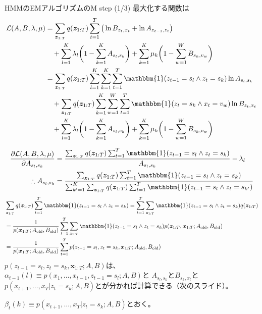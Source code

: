 \documentclass[aspectratio=169,unicode,dvipdfmx,14pt]{beamer}
\begin{document}
\begin{frame}{HMMのEMアルゴリズムのM step (1/3)}
\FontMath
最大化する関数は
\begin{align}
\mathcal{L}(A, B, \lambda, \mu)
& 
= \sum_{\bm{z}_{1:T}} q(\bm{z}_{1:T}) \sum_{t=1}^T \big( \ln B_{z_t,x_t} + \ln A_{z_{t-1},z_t} \big)
\notag \\ & \mbox{ \ \ }
+ \sum_{l=1}^K \lambda_l \bigg( 1 - \sum_{k=1}^K A_{s_l, s_k} \bigg)
+ \sum_{k=1}^K \mu_k \bigg( 1 - \sum_{w=1}^W B_{s_k, v_w} \bigg)
\notag \\ &
= 
\sum_{\bm{z}_{1:T}} q(\bm{z}_{1:T}) \sum_{l=1}^K \sum_{k=1}^K \sum_{t=1}^T 
\mathbbm{1}( z_{t-1} = s_l \wedge z_t = s_k ) \ln A_{s_l, s_k}
\notag \\ & \mbox{ \ \ }
+ \sum_{\bm{z}_{1:T}} q(\bm{z}_{1:T}) \sum_{k=1}^K \sum_{w=1}^W \sum_{t=1}^T 
\mathbbm{1}( z_t = s_k \wedge x_t = v_w ) \ln B_{z_t,x_t}
\notag \\ & \mbox{ \ \ }
+ \sum_{l=1}^K \lambda_l \bigg( 1 - \sum_{k=1}^K A_{s_l, s_k} \bigg)
+ \sum_{k=1}^K \mu_k \bigg( 1 - \sum_{w=1}^W B_{s_k, v_w} \bigg)
\end{align}
\end{frame}


\begin{frame}
\FontMath
\begin{align}
\frac{\partial \mathcal{L}(A, B, \lambda, \mu) }{\partial A_{s_l, s_k}}
& = \frac{ \sum_{\bm{z}_{1:T}} q(\bm{z}_{1:T}) \sum_{t=1}^T 
\mathbbm{1}( z_{t-1} = s_l \wedge z_t = s_k ) }{A_{s_l, s_k}}
- \lambda_l
\\
\therefore A_{s_l, s_k} & = \frac{ \sum_{\bm{z}_{1:T}} q(\bm{z}_{1:T}) \sum_{t=1}^T 
\mathbbm{1}( z_{t-1} = s_l \wedge z_t = s_k ) }
{ \sum_{k^\prime=1}^K \sum_{\bm{z}_{1:T}} q(\bm{z}_{1:T}) \sum_{t=1}^T \mathbbm{1}( z_{t-1} = s_l \wedge z_t = s_{k^\prime} ) }
\end{align}
\begin{align}
& \sum_{\bm{z}_{1:T}} q(\bm{z}_{1:T}) \sum_{t=1}^T 
\mathbbm{1}( z_{t-1} = s_l \wedge z_t = s_k )
=
\sum_{t=1}^T \sum_{\bm{z}_{1:T}}  
\mathbbm{1}( z_{t-1} = s_l \wedge z_t = s_k )q(\bm{z}_{1:T})
\notag \\ &
= 
\frac{1}{p(\bm{x}_{1:T}; A_{\mbox{\scriptsize old}}, B_{\mbox{\scriptsize old}})}
\sum_{t=1}^T \sum_{\bm{z}_{1:T}}  
\mathbbm{1}( z_{t-1} = s_l \wedge z_t = s_k ) 
p(\bm{z}_{1:T} , \bm{x}_{1:T}; A_{\mbox{\scriptsize old}}, B_{\mbox{\scriptsize old}})
\notag \\ &
= 
\frac{1}{p(\bm{x}_{1:T}; A_{\mbox{\scriptsize old}}, B_{\mbox{\scriptsize old}})}
\sum_{t=1}^T p(z_{t-1}=s_l, z_t=s_k, \bm{x}_{1:T}; A_{\mbox{\scriptsize old}}, B_{\mbox{\scriptsize old}})
\end{align}
$p(z_{t-1}=s_l, z_t=s_k, \bm{x}_{1:T}; A, B)$は、
$\alpha_{t-1}(l) \equiv p(x_1,\ldots, x_{t-1}, z_{t-1}=s_l; A, B)$と
$A_{s_l,s_k}$と$B_{s_k,x_t}$と
$p(x_{t+1},\ldots,x_T|z_t=s_k;A,B)$とが分かれば計算できる（次のスライド）。

$\beta_t(k) \equiv p(x_{t+1},\ldots,x_T|z_t=s_k;A,B)$とおく。
\end{frame}
\end{document}
